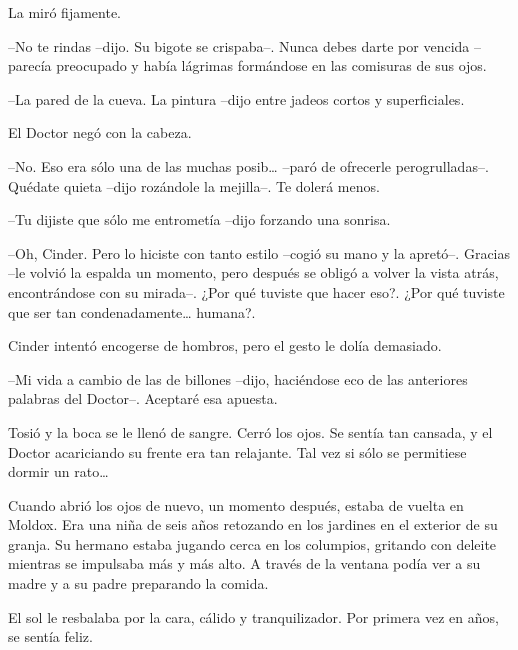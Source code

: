 La miró fijamente. 



--No te rindas --dijo. Su bigote se crispaba--. Nunca debes darte por vencida --parecía preocupado y había lágrimas formándose en las comisuras de sus ojos.



--La pared de la cueva. La pintura --dijo entre jadeos cortos y superficiales.



El Doctor negó con la cabeza. 



--No. Eso era sólo una de las muchas posib… --paró de ofrecerle perogrulladas--. Quédate quieta --dijo rozándole la mejilla--. Te dolerá menos.



--Tu dijiste que sólo me entrometía --dijo forzando una sonrisa.



--Oh, Cinder. Pero lo hiciste con tanto estilo --cogió su mano y la apretó--. Gracias --le volvió la espalda un momento, pero después se obligó a volver la vista atrás, encontrándose con su mirada--. ¿Por qué tuviste que hacer eso?. ¿Por qué tuviste que ser tan condenadamente… humana?.



Cinder intentó encogerse de hombros, pero el gesto le dolía demasiado. 



--Mi vida a cambio de las de billones --dijo, haciéndose eco de las anteriores palabras del Doctor--. Aceptaré esa apuesta.



Tosió y la boca se le llenó de sangre. Cerró los ojos. Se sentía tan cansada, y el Doctor acariciando su frente era tan relajante. Tal vez si sólo se permitiese dormir un rato…



Cuando abrió los ojos de nuevo, un momento después, estaba de vuelta en Moldox. Era una niña de seis años retozando en los jardines en el exterior de su granja. Su hermano estaba jugando cerca en los columpios, gritando con deleite mientras se impulsaba más y más alto. A través de la ventana podía ver a su madre y a su padre preparando la comida.



El sol le resbalaba por la cara, cálido y tranquilizador. Por primera vez en años, se sentía feliz.



















